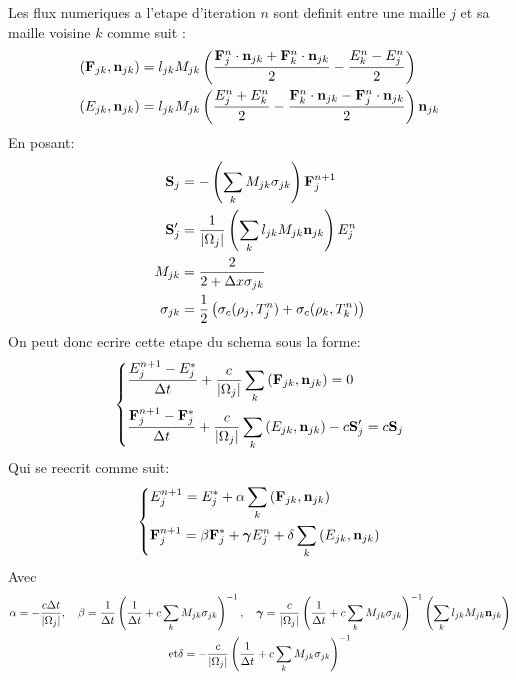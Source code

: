 Les flux numeriques a l'etape d'iteration $n$ sont definit entre une maille $j$ et sa maille voisine $k$ comme suit \parencite{Reference4}:
\begin{align*}
 \left(\mathbf{F}_{jk}, \mathbf{n}_{jk} \right) &= l_{jk} M_{jk} \left( \frac{\mathbf{F}_j^n \cdot \mathbf{n}_{jk} + \mathbf{F}_k^n \cdot \mathbf{n}_{jk}}{2} - \frac{E_k^n - E_j^n}{2} \right) \\
 \left( E_{jk}, \mathbf{n}_{jk} \right) &= l_{jk} M_{jk} \left( \frac{E_j^n + E_k^n}{2} - \frac{\mathbf{F}_k^n \cdot \mathbf{n}_{jk} - \mathbf{F}_j^n \cdot \mathbf{n}_{jk}}{2} \right) \mathbf{n}_{jk} \\
\end{align*}
En posant:
\begin{align*}
 \mathbf{S}_j &= - \left( \sum_k M_{jk} \sigma_{jk} \right) \mathbf{F}_{j}^{n+1} \\
 \mathbf{S}_j^{\prime} &= \frac{1}{\left| \Omega_j \right|} \left( \sum_k l_{jk} M_{jk} \mathbf{n}_{jk} \right) E_j^n \\
 M_{jk} &= \frac{2}{2 + \Delta x \sigma_{jk}}  \\
 \sigma_{jk} &= \frac{1}{2} \left( \sigma_c(\rho_j,T_j^n) + \sigma_c(\rho_k,T_k^n) \right)
\end{align*}
On peut donc ecrire cette etape du schema sous la forme:
\begin{equation*} 
    \begin{dcases}
    \frac{E_j^{n+1} - E_j^*}{\Delta t} + \frac{c}{\left| \Omega_j \right|} \sum_k \left( \mathbf{F}_{jk}, \mathbf{n}_{jk} \right) = 0 \\
    \frac{\mathbf{F}_j^{n+1} - \mathbf{F}_j^*}{\Delta t} + \frac{c}{\left| \Omega_j \right|} \sum_k \left( E_{jk}, \mathbf{n}_{jk} \right) -c \mathbf{S}_j^{\prime} = c \mathbf{S}_j 
    \end{dcases}   
\end{equation*}
Qui se reecrit comme suit:
\begingroup
\Large
\begin{equation} 
    \begin{dcases}
    E_j^{n+1} = E_j^* + \alpha \sum_k \left( \mathbf{F}_{jk}, \mathbf{n}_{jk} \right) \\
    \mathbf{F}_j^{n+1} = \beta \mathbf{F}_j^* + \bm{\gamma} E_j^n + \delta \sum_k \left( E_{jk}, \mathbf{n}_{jk} \right)
    \end{dcases}   
\label{eqn:Step2}
\end{equation}
\endgroup
Avec 
\begin{gather*} 
\alpha = -\frac{c \Delta t}{\left| \Omega_j \right|}, \quad 
\beta = \frac{1}{\Delta t} \left( \frac{1}{\Delta t} + c \sum_k M_{jk} \sigma_{jk} \right)^{-1}, \quad 
\bm{\gamma} = \frac{c}{\left| \Omega_j \right|} \left( \frac{1}{\Delta t} + c \sum_k M_{jk} \sigma_{jk} \right)^{-1} \left( \sum_k l_{jk} M_{jk} \mathbf{n}_{jk} \right) \\
\text{et} \delta = -\frac{c}{\left| \Omega_j \right|} \left( \frac{1}{\Delta t} + c \sum_k M_{jk} \sigma_{jk} \right)^{-1}
\end{gather*}

